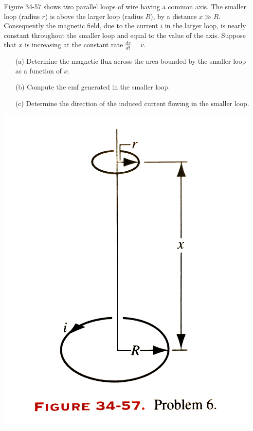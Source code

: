 \documentclass[12pt,letterpaper,boxed,cm]{hmcpset}
\newcommand{\f}[2]{\frac{#1}{#2}}
\begin{document}
\begin{problem}[34-P6*]
Figure 34-57 shows two parallel loops of wire having a common axis. The smaller loop (radius $r$) is above the larger loop (radius $R$), by a distance $x \gg R$. Consequently the magnetic field, due to the current $i$ in the larger loop, is nearly constant throughout the smaller loop and equal to the value of the axis. Suppose that $x$ is increasing at the constant rate $\f{dx}{dt} = v$.
\begin{enumerate}
	\item[(a)] Determine the magnetic flux across the area bounded by the smaller loop as a function of $x$.
	\item[(b)] Compute the emf generated in the smaller loop.
	\item[(c)] Determine the direction of the induced current flowing in the smaller loop. 
\end{enumerate}
\begin{center}
	\includegraphics[scale=0.1]{02.jpg}
\end{center}
\end{problem}
\begin{solution}
\end{solution}
\newpage
\end{document}
